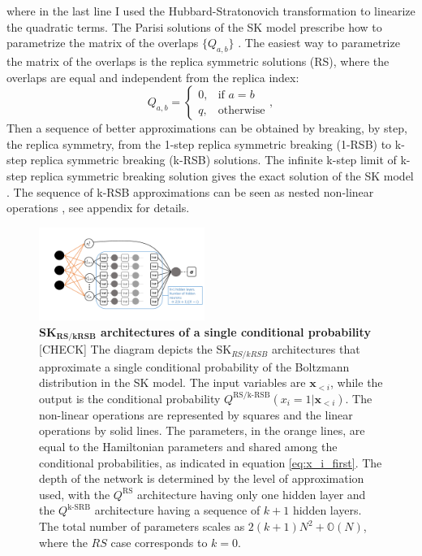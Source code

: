 \documentclass[aps,physrev,10pt,floatfix,reprint]{revtex4-2}
\begin{document}
where in the last line I used the Hubbard-Stratonovich transformation to linearize the quadratic terms. 
The Parisi solutions of the SK model prescribe how to parametrize the matrix of the overlaps $\{Q_{a,b}\}$ \cite{10.1142/0271}. The easiest way to parametrize the matrix of the overlaps is the replica symmetric solutions (RS), where the overlaps are equal and independent from the replica index: 
$$
Q_{a,b}=\begin{cases}
			0, & \text{if $a=b$}\\
            q, & \text{otherwise}
		 \end{cases},
$$
Then a sequence of better approximations can be obtained by breaking, by step, the replica symmetry, from the 1-step replica symmetric breaking (1-RSB) to k-step replica symmetric breaking (k-RSB) solutions. The infinite k-step limit of k-step replica symmetric breaking solution gives the exact solution of the SK model \cite{10.2307/20159953}.
The sequence of k-RSB approximations can be seen as nested non-linear operations \cite{Parisi_1980}, see appendix for details. 
\begin{figure}[!h]
    \centering 
    \includegraphics[width=0.48\textwidth]{img/SK_arch.pdf}
    \caption{\textbf{SK$\mathbf{_{RS/kRSB}}$ architectures of a single conditional probability} [CHECK] The diagram depicts the SK$_{RS/kRSB}$ architectures that approximate a single conditional probability of the Boltzmann distribution in the SK model. The input variables are $\mathbf{x}_{<i}$, while the output is the conditional probability $Q^{\text{RS/k-RSB}}\left(x_{i}=1|\mathbf{x}_{<i}\right)$. The non-linear operations are represented by squares and the linear operations by solid lines. The parameters, in the orange lines, are equal to the Hamiltonian parameters and shared among the conditional probabilities, as indicated in equation \ref{eq:x_i_first}. The depth of the network is determined by the level of approximation used, with the $Q^{\text{RS}}$ architecture having only one hidden layer and the $Q^{\text{k-SRB}}$ architecture having a sequence of $k+1$ hidden layers. The total number of parameters scales as $2(k+1)N^2 + \mathbb{O}(N)$, where the $RS$ case corresponds to $k=0$.}
    \label{fig:SK_arch}
\end{figure}
\end{document}
